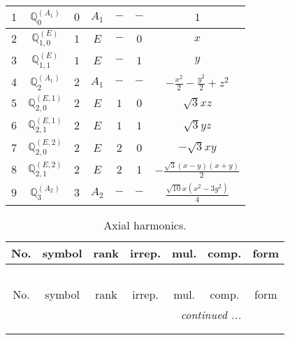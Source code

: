\documentclass[fleqn,10pt,landscape]{article}
\begin{document}
\begin{itemize}
\begin{center}
\begin{longtable}{ccccccc}
$ 1 $ & $ \mathbb{Q}_{0}^{(A_{1})} $ & $ 0 $ & $ A_{1} $ & $ - $ & $ - $ & $ 1 $ \\ \hline
$ 2 $ & $ \mathbb{Q}_{1,0}^{(E)} $ & $ 1 $ & $ E $ & $ - $ & $ 0 $ & $ x $ \\
$ 3 $ & $ \mathbb{Q}_{1,1}^{(E)} $ & $ 1 $ & $ E $ & $ - $ & $ 1 $ & $ y $ \\ \hline
$ 4 $ & $ \mathbb{Q}_{2}^{(A_{1})} $ & $ 2 $ & $ A_{1} $ & $ - $ & $ - $ & $ - \frac{x^{2}}{2} - \frac{y^{2}}{2} + z^{2} $ \\
$ 5 $ & $ \mathbb{Q}_{2,0}^{(E,1)} $ & $ 2 $ & $ E $ & $ 1 $ & $ 0 $ & $ \sqrt{3} x z $ \\
$ 6 $ & $ \mathbb{Q}_{2,1}^{(E,1)} $ & $ 2 $ & $ E $ & $ 1 $ & $ 1 $ & $ \sqrt{3} y z $ \\
$ 7 $ & $ \mathbb{Q}_{2,0}^{(E,2)} $ & $ 2 $ & $ E $ & $ 2 $ & $ 0 $ & $ - \sqrt{3} x y $ \\
$ 8 $ & $ \mathbb{Q}_{2,1}^{(E,2)} $ & $ 2 $ & $ E $ & $ 2 $ & $ 1 $ & $ - \frac{\sqrt{3} \left(x - y\right) \left(x + y\right)}{2} $ \\ \hline
$ 9 $ & $ \mathbb{Q}_{3}^{(A_{2})} $ & $ 3 $ & $ A_{2} $ & $ - $ & $ - $ & $ \frac{\sqrt{10} x \left(x^{2} - 3 y^{2}\right)}{4} $ \\
\end{longtable}
\end{center}
\begin{center}
\renewcommand{\arraystretch}{1.3}
\begin{longtable}{ccccccc}
\caption{Axial harmonics.}
 \\
 \hline \hline
No. & symbol & rank & irrep. & mul. & comp. & form \\ \hline \endfirsthead

\multicolumn{6}{l}{\tablename\ \thetable{}} \\
 \hline \hline
No. & symbol & rank & irrep. & mul. & comp. & form \\ \hline \endhead

 \hline \hline
\multicolumn{6}{r}{\footnotesize\it continued ...} \\ \endfoot

 \hline \hline
\multicolumn{6}{r}{} \\ \endlastfoot


\end{longtable}
\end{center}
\end{itemize}
\end{document}
